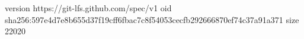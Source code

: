 version https://git-lfs.github.com/spec/v1
oid sha256:597e4d7e8b655d37f19cff6fbac7c8f54053cecfb292666870ef74c37a91a371
size 22020
